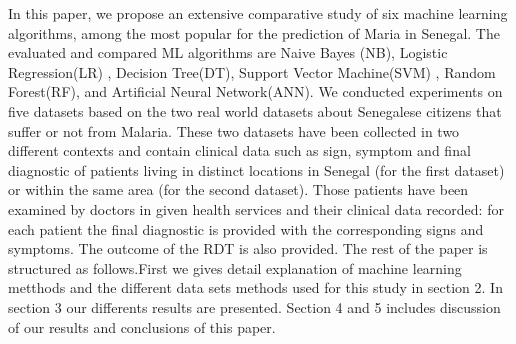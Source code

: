  In this paper, we propose an  extensive comparative study of six machine learning algorithms, among the most popular for the prediction of Maria in Senegal. The evaluated and compared ML algorithms are Naive Bayes (NB), Logistic Regression(LR) ,  Decision Tree(DT), Support Vector Machine(SVM) ,
 Random Forest(RF),
 and Artificial Neural Network(ANN). We conducted experiments on five datasets based on the two real world datasets about Senegalese citizens that suffer or not from Malaria. These two datasets have been collected in two different contexts and contain clinical data such as sign, symptom and final diagnostic of patients living in distinct locations in Senegal (for the first dataset) or within the same area (for the second dataset). Those patients have been examined by doctors in given health services and their clinical data recorded: for each patient the final diagnostic is provided with the corresponding signs and symptoms. The outcome of the RDT is also provided. 
The rest of the paper is structured as follows.First we gives detail explanation of machine learning metthods and the different data sets methods used for this study in section 2. In section 3 our  differents results are presented. Section 4 and 5 includes discussion of our results and conclusions of this paper.
 \newpage